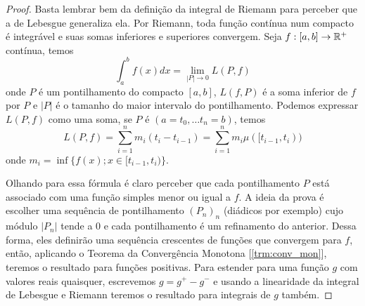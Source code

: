 \begin{problem}
    \label{prob:l3:2}
\end{problem}
\begin{proof}
    Basta lembrar bem da definição da integral de Riemann para perceber que a de Lebesgue generaliza ela.
    Por Riemann, toda função contínua num compacto é integrável e suas somas inferiores e superiores convergem. Seja $f: [a,b] \rightarrow \mathbb{R}^+$ contínua, temos
    $$\int_a^b f(x) dx = \lim_{|P|\to 0} L(P,f)$$
    onde $P$ é um pontilhamento do compacto $[a,b]$, $L(f,P)$ é a soma inferior de $f$ por $P$ e $|P|$ é 
    o tamanho do maior intervalo do pontilhamento. Podemos expressar
    $L(P,f)$ como uma soma, se $P$ é $(a = t_0, \dots t_n = b)$, temos 
    $$L(P,f) = \sum_{i = 1}^{n} m_i (t_i - t_{i-1}) = \sum_{i = 1}^{n} m_i \mu([t_{i-1},t_i))$$
    onde $m_i = \inf\{f(x); x \in [t_{i-1}, t_{i})\}$.

    Olhando para essa fórmula é claro perceber que cada pontilhamento $P$ está associado com uma 
    função simples menor ou igual a $f$. A ideia da prova é escolher uma sequência de pontilhamento $(P_n)_n$ (diádicos por exemplo)
    cujo módulo $|P_n|$  tende a 0 e cada pontilhamento é um 
    refinamento do anterior. Dessa forma, eles definirão uma sequência crescentes de funções que convergem para $f$, então,  
    aplicando o Teorema da Convergência Monotona [\ref{trm:conv_mon}], teremos o resultado para funções positivas. Para estender 
    para uma função $g$ com valores reais quaisquer, escrevemos $g = g^+ - g^-$ e usando a linearidade da integral de Lebesgue e Riemann
    teremos o resultado para integrais de $g$ também.


\end{proof}

